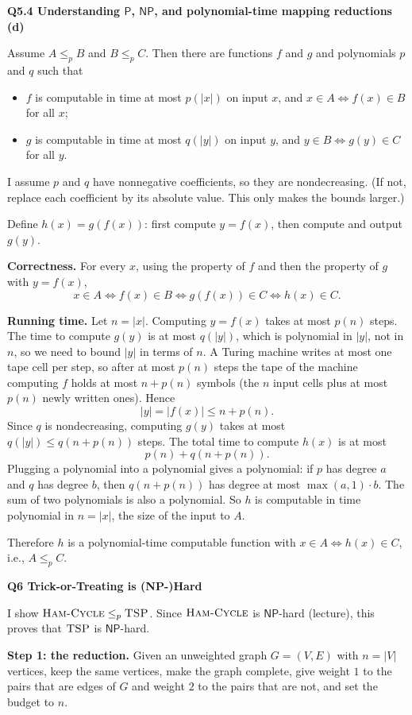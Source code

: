\documentclass[11pt]{article}
\newcommand{\abs}[1]{\left|#1\right|}
\newcommand{\lp}{\leq_p}
\newcommand{\cproblem}[1]{\textsc{#1}}
\renewcommand{\P}{\textsf{P}}
\newcommand{\NP}{\textsf{NP}}
\newcommand{\TSP}{\cproblem{TSP}}
\newcommand{\HC}{\cproblem{Ham-Cycle}}
\newcommand{\qpage}[1]{\clearpage\noindent\textbf{\large #1}\par\medskip}
\begin{document}
\qpage{Q5.4 Understanding $\P$, $\NP$, and polynomial-time mapping reductions (d)}

Assume $A \lp B$ and $B \lp C$.
Then there are functions $f$ and $g$ and polynomials $p$ and $q$ such that
\begin{itemize}
  \item $f$ is computable in time at most $p(\abs{x})$ on input $x$, and $x \in A \iff f(x) \in B$ for all $x$;
  \item $g$ is computable in time at most $q(\abs{y})$ on input $y$, and $y \in B \iff g(y) \in C$ for all $y$.
\end{itemize}
I assume $p$ and $q$ have nonnegative coefficients, so they are nondecreasing. (If not, replace each coefficient by its absolute value. This only makes the bounds larger.)

Define $h(x) = g(f(x))$: first compute $y = f(x)$, then compute and output $g(y)$.

\textbf{Correctness.}
For every $x$, using the property of $f$ and then the property of $g$ with $y = f(x)$,
\[
  x \in A \iff f(x) \in B \iff g(f(x)) \in C \iff h(x) \in C.
\]

\textbf{Running time.}
Let $n = \abs{x}$.
Computing $y = f(x)$ takes at most $p(n)$ steps.
The time to compute $g(y)$ is at most $q(\abs{y})$, which is polynomial in $\abs{y}$, not in $n$, so we need to bound $\abs{y}$ in terms of $n$.
A Turing machine writes at most one tape cell per step, so after at most $p(n)$ steps the tape of the machine computing $f$ holds at most $n + p(n)$ symbols (the $n$ input cells plus at most $p(n)$ newly written ones).
Hence
\[
  \abs{y} = \abs{f(x)} \leq n + p(n).
\]
Since $q$ is nondecreasing, computing $g(y)$ takes at most $q(\abs{y}) \leq q(n + p(n))$ steps.
The total time to compute $h(x)$ is at most
\[
  p(n) + q(n + p(n)).
\]
Plugging a polynomial into a polynomial gives a polynomial: if $p$ has degree $a$ and $q$ has degree $b$, then $q(n + p(n))$ has degree at most $\max(a,1) \cdot b$. The sum of two polynomials is also a polynomial.
So $h$ is computable in time polynomial in $n = \abs{x}$, the size of the input to $A$.

Therefore $h$ is a polynomial-time computable function with $x \in A \iff h(x) \in C$, i.e., $A \lp C$.

\qpage{Q6 Trick-or-Treating is (NP-)Hard}

I show $\HC \lp \TSP$.
Since $\HC$ is $\NP$-hard (lecture), this proves that $\TSP$ is $\NP$-hard.

\textbf{Step 1: the reduction.}
Given an unweighted graph $G = (V, E)$ with $n = \abs{V}$ vertices, keep the same vertices, make the graph complete, give weight $1$ to the pairs that are edges of $G$ and weight $2$ to the pairs that are not, and set the budget to $n$.
\end{document}
